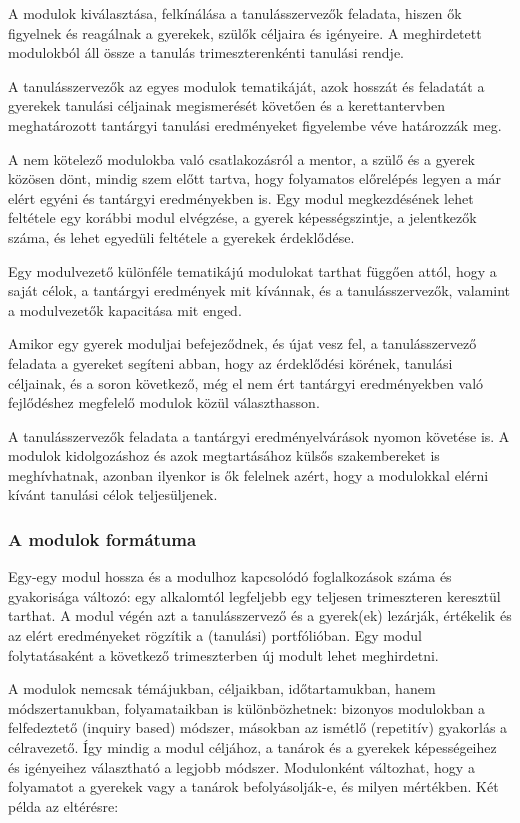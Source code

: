 A modulok kiválasztása, felkínálása a tanulásszervezők feladata,
hiszen ők figyelnek és reagálnak a gyerekek, szülők céljaira és igényeire. A
meghirdetett modulokból áll össze a tanulás trimeszterenkénti tanulási rendje.

A tanulásszervezők az egyes modulok tematikáját, azok hosszát és feladatát a
gyerekek tanulási céljainak megismerését követően és a kerettantervben
meghatározott tantárgyi tanulási eredményeket figyelembe véve határozzák meg.

A nem kötelező modulokba való csatlakozásról a mentor, a szülő és a gyerek
közösen dönt,
mindig szem előtt tartva, hogy folyamatos előrelépés legyen a már elért egyéni
és tantárgyi eredményekben is. Egy modul megkezdésének lehet feltétele egy
korábbi modul elvégzése, a gyerek képességszintje, a jelentkezők száma, és
lehet egyedüli feltétele a gyerekek érdeklődése.

Egy modulvezető különféle tematikájú modulokat tarthat függően attól, hogy a
saját célok, a tantárgyi eredmények mit kívánnak, és a tanulásszervezők,
valamint a modulvezetők kapacitása mit enged.

Amikor egy gyerek moduljai befejeződnek, és újat vesz fel, a tanulásszervező
feladata a gyereket segíteni abban, hogy az érdeklődési körének, tanulási
céljainak, és a soron következő, még el nem ért tantárgyi eredményekben való
fejlődéshez megfelelő modulok közül választhasson.

A tanulásszervezők feladata a tantárgyi eredményelvárások nyomon követése is. A
modulok kidolgozáshoz és azok megtartásához külsős szakembereket is
meghívhatnak, azonban ilyenkor is ők felelnek azért, hogy a modulokkal elérni
kívánt tanulási célok teljesüljenek.

\subsubsection{A modulok formátuma}

Egy-egy modul hossza és a modulhoz kapcsolódó foglalkozások száma és
gyakorisága változó: egy alkalomtól legfeljebb egy teljesen trimeszteren
keresztül tarthat. A modul végén azt a tanulásszervező és a gyerek(ek)
lezárják, értékelik és az elért eredményeket rögzítik a (tanulási)
portfólióban. Egy modul folytatásaként a következő trimeszterben új modult
lehet meghirdetni.

A modulok nemcsak témájukban, céljaikban, időtartamukban, hanem
módszertanukban, folyamataikban is különbözhetnek: bizonyos modulokban a
felfedeztető (inquiry based) módszer, másokban az ismétlő (repetitív)
gyakorlás a célravezető. Így mindig a modul céljához, a tanárok és a
gyerekek képességeihez és igényeihez választható a legjobb módszer.
Modulonként változhat, hogy a folyamatot a gyerekek vagy a tanárok
befolyásolják-e, és milyen mértékben. Két példa az eltérésre:

